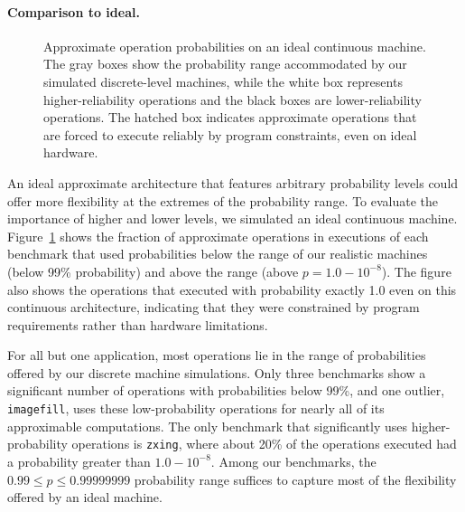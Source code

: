 \documentclass[10pt,nocopyrightspace,preprint]{sigplanconf}
\newcommand{\code}{\lstinline[emphstyle={},keywordstyle={}]}
\begin{document}
\paragraph{Comparison to ideal.}

\begin{figure}
    \hspace{-3ex}
    
    \caption{Approximate operation probabilities on an ideal continuous
    machine. The gray boxes show the probability range accommodated by
    our simulated discrete-level machines, while the white box represents
    higher-reliability operations and the black boxes are
    lower-reliability operations.
    The hatched box indicates approximate operations that are forced to
    execute reliably by program constraints, even on ideal hardware.}
    \label{fig:idealhist}
\end{figure}

An ideal approximate architecture that features arbitrary probability levels
could offer more flexibility at the extremes of the probability range.
To evaluate the importance of higher and lower levels, we
simulated an ideal continuous machine.
Figure~\ref{fig:idealhist} shows the fraction of approximate operations in
executions of each benchmark that used probabilities below the range of our
realistic machines (below 99\% probability) and above the range (above $p =
1.0 - 10^{-8}$).
The figure also shows the operations that executed with probability exactly
1.0 even on this continuous architecture, indicating that they were
constrained by program requirements rather than hardware limitations.

For all but one application, most operations lie in the range of probabilities
offered by our discrete machine simulations.
Only three benchmarks show a significant number of operations with
probabilities below 99\%, and one outlier, \code{imagefill}, uses these
low-probability operations for nearly all of its approximable computations.
The only benchmark that significantly uses higher-probability operations
is \code{zxing}, where about 20\% of the operations executed had a probability
greater than $1.0 - 10^{-8}$.
Among our benchmarks, the $0.99 \le p \le 0.99999999$ probability range
suffices to capture most of the flexibility offered by an ideal machine.
\end{document}
